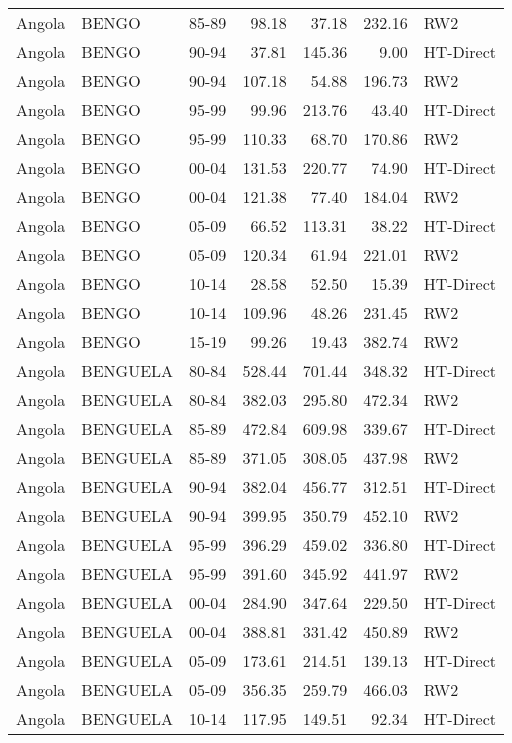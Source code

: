 \begin{longtable}{lllrrrl}
  Angola & BENGO & 85-89 & 98.18 & 37.18 & 232.16 & RW2 \\ 
  Angola & BENGO & 90-94 & 37.81 & 145.36 & 9.00 & HT-Direct \\ 
  Angola & BENGO & 90-94 & 107.18 & 54.88 & 196.73 & RW2 \\ 
  Angola & BENGO & 95-99 & 99.96 & 213.76 & 43.40 & HT-Direct \\ 
  Angola & BENGO & 95-99 & 110.33 & 68.70 & 170.86 & RW2 \\ 
  Angola & BENGO & 00-04 & 131.53 & 220.77 & 74.90 & HT-Direct \\ 
  Angola & BENGO & 00-04 & 121.38 & 77.40 & 184.04 & RW2 \\ 
  Angola & BENGO & 05-09 & 66.52 & 113.31 & 38.22 & HT-Direct \\ 
  Angola & BENGO & 05-09 & 120.34 & 61.94 & 221.01 & RW2 \\ 
  Angola & BENGO & 10-14 & 28.58 & 52.50 & 15.39 & HT-Direct \\ 
  Angola & BENGO & 10-14 & 109.96 & 48.26 & 231.45 & RW2 \\ 
  Angola & BENGO & 15-19 & 99.26 & 19.43 & 382.74 & RW2 \\ 
  Angola & BENGUELA & 80-84 & 528.44 & 701.44 & 348.32 & HT-Direct \\ 
  Angola & BENGUELA & 80-84 & 382.03 & 295.80 & 472.34 & RW2 \\ 
  Angola & BENGUELA & 85-89 & 472.84 & 609.98 & 339.67 & HT-Direct \\ 
  Angola & BENGUELA & 85-89 & 371.05 & 308.05 & 437.98 & RW2 \\ 
  Angola & BENGUELA & 90-94 & 382.04 & 456.77 & 312.51 & HT-Direct \\ 
  Angola & BENGUELA & 90-94 & 399.95 & 350.79 & 452.10 & RW2 \\ 
  Angola & BENGUELA & 95-99 & 396.29 & 459.02 & 336.80 & HT-Direct \\ 
  Angola & BENGUELA & 95-99 & 391.60 & 345.92 & 441.97 & RW2 \\ 
  Angola & BENGUELA & 00-04 & 284.90 & 347.64 & 229.50 & HT-Direct \\ 
  Angola & BENGUELA & 00-04 & 388.81 & 331.42 & 450.89 & RW2 \\ 
  Angola & BENGUELA & 05-09 & 173.61 & 214.51 & 139.13 & HT-Direct \\ 
  Angola & BENGUELA & 05-09 & 356.35 & 259.79 & 466.03 & RW2 \\ 
  Angola & BENGUELA & 10-14 & 117.95 & 149.51 & 92.34 & HT-Direct \\ 

\end{longtable}
